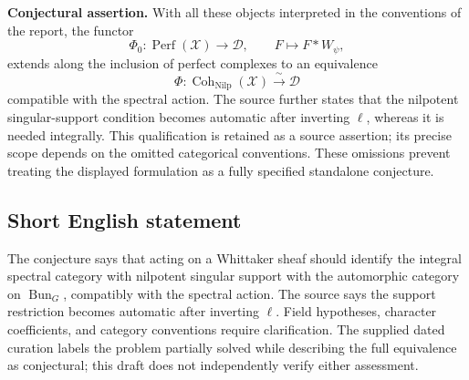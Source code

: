 \documentclass[11pt]{article}
\begin{document}
\textbf{Conjectural assertion.} With all these objects interpreted in the conventions of the report, the functor
\[
\Phi_0:\operatorname{Perf}(\mathcal X)\longrightarrow\mathcal D,
\qquad F\longmapsto F*W_\psi,
\]
extends along the inclusion of perfect complexes to an equivalence
\[
\Phi:\operatorname{Coh}_{\mathrm{Nilp}}(\mathcal X)
\xrightarrow{\ \sim\ }\mathcal D
\]
compatible with the spectral action. The source further states that the nilpotent singular-support condition becomes automatic after inverting \(\ell\), whereas it is needed integrally. This qualification is retained as a source assertion; its precise scope depends on the omitted categorical conventions. These omissions prevent treating the displayed formulation as a fully specified standalone conjecture.
\subsection{Short English statement}
The conjecture says that acting on a Whittaker sheaf should identify the integral spectral category with nilpotent singular support with the automorphic category on \(\operatorname{Bun}_G\), compatibly with the spectral action. The source says the support restriction becomes automatic after inverting \(\ell\). Field hypotheses, character coefficients, and category conventions require clarification. The supplied dated curation labels the problem partially solved while describing the full equivalence as conjectural; this draft does not independently verify either assessment.
\end{document}
